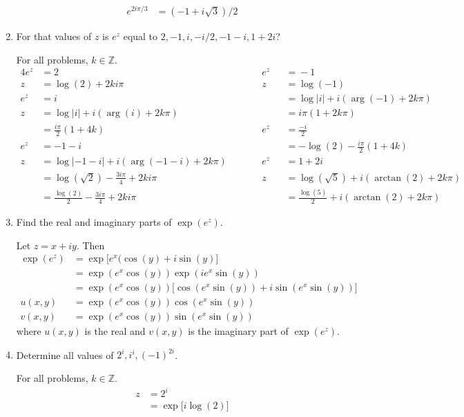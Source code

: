\begin{enumerate}
\begin{align*}
    e^{2i\pi/3} & = (-1 + i\sqrt{3})/2
  \end{align*}
\item
  For that values of \(z\) is \(e^z\) equal to \(2,-1,i,-i/2,-1 - i,1 + 2i\)?
  \par\smallskip
  For all problems, \(k\in\mathbb{Z}\).
  \begin{alignat*}{4}
    e^z & = 2 & \qquad & e^z && ={} -1\\
    z & = \log(2) + 2ki\pi & & z && ={} \log(-1)\\
    e^z & = i & & && ={}\log\lvert i\rvert + i(\arg(-1) + 2k\pi)\\
    z & = \log\lvert i\rvert + i(\arg(i) + 2k\pi) & & && = {} i\pi(1 + 2k\pi)\\
    & = \frac{i\pi}{2}(1 + 4k) & & e^z && = \frac{-i}{2}\\
    e^z & = -1 - i & & && = -\log(2) - \frac{i\pi}{2}(1 + 4k)\\
    z & = \log\lvert -1 - i\rvert + i(\arg(-1 - i) + 2k\pi) & &
    e^z && ={} 1 + 2i\\
    & = \log(\sqrt{2}) - \frac{3i\pi}{4} + 2ki\pi & & z
    && ={} \log(\sqrt{5}) + i(\arctan(2) + 2k\pi)\\
    & = \frac{\log(2)}{2} - \frac{3i\pi}{4} + 2ki\pi & &
    && ={} \frac{\log(5)}{2} + i(\arctan(2) + 2k\pi)
  \end{alignat*}
\item
  Find the real and imaginary parts of \(\exp(e^z)\).
  \par\smallskip
  Let \(z = x + iy\).
  Then
  \begin{align*}
    \exp(e^z) & = \exp\bigl[e^x(\cos(y) + i\sin(y)\bigr]\\
              & = \exp(e^x\cos(y))\exp(ie^x\sin(y))\\
              & = \exp(e^x\cos(y))
                \bigl[\cos(e^x\sin(y)) + i\sin(e^x\sin(y))\bigr]\\
    u(x, y) & = \exp(e^x\cos(y))\cos(e^x\sin(y))\\
    v(x, y) & = \exp(e^x\cos(y))\sin(e^x\sin(y))
  \end{align*}
  where \(u(x,y)\) is the real and \(v(x,y)\) is the imaginary part of
  \(\exp(e^z)\).
\item
  Determine all values of \(2^i,i^i,(-1)^{2i}\).
  \par\smallskip
  For all problems, \(k\in\mathbb{Z}\).
  \begin{align*}
    z & = 2^i\\
      & = \exp\bigl[i\log(2)\bigr]\\

\end{align*}
\end{enumerate}
